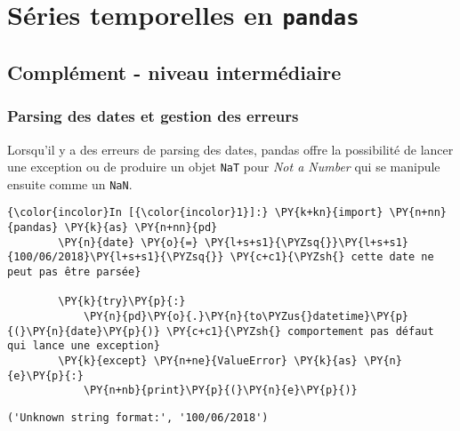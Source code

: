     
    
    
    

    

    \hypertarget{suxe9ries-temporelles-en-pandas}{%
\section{\texorpdfstring{Séries temporelles en
\texttt{pandas}}{Séries temporelles en pandas}}\label{suxe9ries-temporelles-en-pandas}}

    \hypertarget{compluxe9ment---niveau-intermuxe9diaire}{%
\subsection{Complément - niveau
intermédiaire}\label{compluxe9ment---niveau-intermuxe9diaire}}

    \hypertarget{parsing-des-dates-et-gestion-des-erreurs}{%
\subsubsection{Parsing des dates et gestion des
erreurs}\label{parsing-des-dates-et-gestion-des-erreurs}}

    Lorsqu'il y a des erreurs de parsing des dates, pandas offre la
possibilité de lancer une exception ou de produire un objet \texttt{NaT}
pour \emph{Not a Number} qui se manipule ensuite comme un \texttt{NaN}.

    \begin{Verbatim}[commandchars=\\\{\}]
{\color{incolor}In [{\color{incolor}1}]:} \PY{k+kn}{import} \PY{n+nn}{pandas} \PY{k}{as} \PY{n+nn}{pd}
        \PY{n}{date} \PY{o}{=} \PY{l+s+s1}{\PYZsq{}}\PY{l+s+s1}{100/06/2018}\PY{l+s+s1}{\PYZsq{}} \PY{c+c1}{\PYZsh{} cette date ne peut pas être parsée}
        
        \PY{k}{try}\PY{p}{:}
            \PY{n}{pd}\PY{o}{.}\PY{n}{to\PYZus{}datetime}\PY{p}{(}\PY{n}{date}\PY{p}{)} \PY{c+c1}{\PYZsh{} comportement pas défaut qui lance une exception}
        \PY{k}{except} \PY{n+ne}{ValueError} \PY{k}{as} \PY{n}{e}\PY{p}{:}
            \PY{n+nb}{print}\PY{p}{(}\PY{n}{e}\PY{p}{)}
\end{Verbatim}


    \begin{Verbatim}[commandchars=\\\{\}]
('Unknown string format:', '100/06/2018')

    \end{Verbatim}

